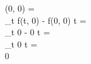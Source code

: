 (0, 0) =\\
\lim_{t }
\frac
{f(t, 0) - f(0, 0)}
{t} =\\
\lim_{t }
\frac
{0 - 0}
{t} =\\
\lim_{t }
\frac
{0}
{t} =\\
0